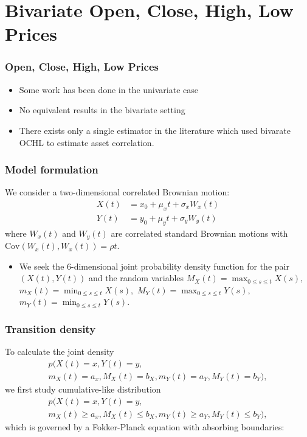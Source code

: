 \documentclass{beamer}
\begin{document}
\section{Bivariate Open, Close, High, Low Prices}
\begin{frame}
  \frametitle{Open, Close, High, Low Prices}
  \begin{itemize}
  \item Some work has been done in the univariate case
  \item No equivalent results in the bivariate setting
  \item There exists only a single estimator in the literature which
    used bivarate OCHL to estimate asset correlation.
  \end{itemize}
\end{frame}
\begin{frame}
  \frametitle{Model formulation}
  We consider a two-dimensional correlated Brownian motion:
\begin{align*}
  X(t) &= x_0 + \mu_x t + \sigma_x W_x(t)  \\
  Y(t) &= y_0 + \mu_y t + \sigma_y W_y(t) 
\end{align*}
where $W_x(t)$ and $W_y(t)$ are correlated standard Brownian motions
with $\mbox{Cov}(W_x(t), W_x(t)) = \rho t$.

\begin{itemize}
\item We seek the 6-dimensional joint probability density
function for the pair $(X(t), Y(t))$ and the random variables
$M_X(t)=\max_{0\leq s\leq t}X(s),$ $m_X(t)=\min_{0\leq s\leq t}X(s),$
$M_Y(t)=\max_{0\leq s\leq t}Y(s),$ $m_Y(t)=\min_{0\leq s\leq t}Y(s)$.
\end{itemize}
\end{frame}
\begin{frame}
  \frametitle{Transition density} To calculate the joint density
  \begin{multline*}
    p(X(t) = x, Y(t) = y, \\
    m_X(t) = a_x, M_X(t) = b_X, m_Y(t) = a_Y, M_Y(t) = b_Y),
  \end{multline*}
  we first study cumulative-like distribution
  \begin{multline*}
    p(X(t) = x, Y(t) = y, \\
    m_X(t) \geq a_x, M_X(t) \leq b_X, m_Y(t) \geq
    a_Y, M_Y(t) \leq b_Y),
  \end{multline*}
  which is governed by a Fokker-Planck equation with absorbing boundaries:
\end{frame}
\end{document}
